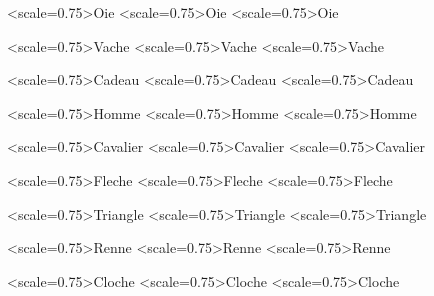 \documentclass{article}
\begin{document}
\begin{PresentationCode}{}
\TangramTikz<scale=0.75>{Oie}
\TangramTikz[Correction]<scale=0.75>{Oie}
\TangramTikz[CorrectionCouleur]<scale=0.75>{Oie}
\end{PresentationCode}

\begin{PresentationCode}{}
\TangramTikz<scale=0.75>{Vache}
\TangramTikz[Correction]<scale=0.75>{Vache}
\TangramTikz[CorrectionCouleur]<scale=0.75>{Vache}
\end{PresentationCode}

\begin{PresentationCode}{}
\TangramTikz<scale=0.75>{Cadeau}
\TangramTikz[Correction]<scale=0.75>{Cadeau}
\TangramTikz[CorrectionCouleur]<scale=0.75>{Cadeau}
\end{PresentationCode}

\begin{PresentationCode}{}
\TangramTikz<scale=0.75>{Homme}
\TangramTikz[Correction]<scale=0.75>{Homme}
\TangramTikz[CorrectionCouleur]<scale=0.75>{Homme}
\end{PresentationCode}

\begin{PresentationCode}{}
\TangramTikz<scale=0.75>{Cavalier}
\TangramTikz[Correction]<scale=0.75>{Cavalier}
\TangramTikz[CorrectionCouleur]<scale=0.75>{Cavalier}
\end{PresentationCode}

\begin{PresentationCode}{}
\TangramTikz<scale=0.75>{Fleche}
\TangramTikz[Correction]<scale=0.75>{Fleche}
\TangramTikz[CorrectionCouleur]<scale=0.75>{Fleche}
\end{PresentationCode}

\begin{PresentationCode}{}
\TangramTikz<scale=0.75>{Triangle}
\TangramTikz[Correction]<scale=0.75>{Triangle}
\TangramTikz[CorrectionCouleur]<scale=0.75>{Triangle}
\end{PresentationCode}

\begin{PresentationCode}{}
\TangramTikz<scale=0.75>{Renne}
\TangramTikz[Correction]<scale=0.75>{Renne}
\TangramTikz[CorrectionCouleur]<scale=0.75>{Renne}
\end{PresentationCode}

\begin{PresentationCode}{}
\TangramTikz<scale=0.75>{Cloche}
\TangramTikz[Correction]<scale=0.75>{Cloche}
\TangramTikz[CorrectionCouleur]<scale=0.75>{Cloche}
\end{PresentationCode}
\end{document}
